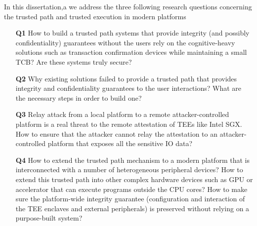 In this dissertation,a we address the three following research questions concerning the trusted path and trusted execution in modern platforms 
\begin{enumerate}
  
  	\item[\textbf{Q1}] How to build a trusted path systems that provide integrity (and possibly confidentiality) guarantees without the users rely on the cognitive-heavy solutions such as transaction confirmation devices while maintaining a small TCB? Are these systems truly secure?
  	
    \item[\textbf{Q2}] Why existing solutions failed to provide a trusted path that provides integrity and confidentiality guarantees to the user interactions? What are the necessary steps in order to build one?
    
    \item[\textbf{Q3}] Relay attack from a local platform to a remote attacker-controlled platform is a real threat to the remote attestation of TEEs like Intel SGX. How to ensure that the attacker cannot relay the attestation to an attacker-controlled platform that exposes all the sensitive IO data?
    
    \item[\textbf{Q4}] How to extend the trusted path mechanism to a modern platform that is interconnected with a number of heterogeneous peripheral devices? How to extend this trusted path into other complex hardware devices such as GPU or accelerator that can execute programs outside the CPU cores? How to make sure the platform-wide integrity guarantee (configuration and interaction of the TEE enclaves and external peripherals) is preserved without relying on a purpose-built system?  
\end{enumerate}

